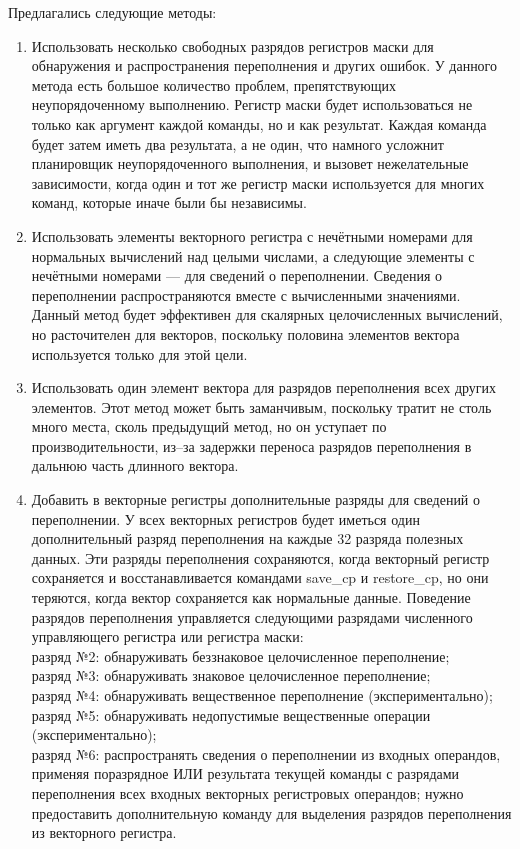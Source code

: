 \documentclass[forwardcom.tex]{subfiles}
\begin{document}
Предлагались следующие методы:
\begin{enumerate}
	\item Использовать несколько свободных разрядов регистров маски для обнаружения и распространения переполнения и других ошибок. У данного метода есть большое количество проблем, препятствующих неупорядоченному выполнению. Регистр маски будет использоваться не только как аргумент каждой команды, но и как результат. Каждая команда будет затем иметь два результата, а не один, что намного усложнит планировщик неупорядоченного выполнения, и вызовет нежелательные зависимости, когда один и тот же регистр маски используется для многих команд, которые иначе были бы независимы.
	
	\item Использовать элементы векторного регистра с нечётными номерами для нормальных вычислений над целыми числами, а следующие элементы с нечётными номерами --- для сведений о переполнении. Сведения о переполнении распространяются вместе с вычисленными значениями.	Данный метод будет эффективен для скалярных целочисленных вычислений, но расточителен для векторов, поскольку половина элементов вектора используется только для этой цели. 
	
	\item Использовать один элемент вектора для разрядов переполнения всех других элементов. Этот метод может быть заманчивым, поскольку тратит не столь много места, сколь предыдущий метод, но он уступает по производительности, из--за задержки переноса разрядов переполнения в дальнюю часть длинного вектора.
	
    \item Добавить в векторные регистры  дополнительные разряды для сведений о переполнении. У всех векторных регистров будет иметься один дополнительный разряд переполнения на каждые 32 разряда полезных данных. Эти разряды переполнения сохраняются, когда векторный регистр сохраняется и восстанавливается командами save\_cp и restore\_cp, но они теряются, когда вектор сохраняется как нормальные данные. Поведение разрядов переполнения управляется следующими разрядами численного управляющего регистра или регистра маски: \\
разряд №2: обнаруживать беззнаковое целочисленное переполнение; \\
разряд №3: обнаруживать знаковое целочисленное переполнение; \\
разряд №4: обнаруживать вещественное переполнение (экспериментально); \\
разряд №5: обнаруживать недопустимые вещественные операции (экспериментально); \\
разряд №6: распространять сведения о переполнении из входных операндов, применяя поразрядное ИЛИ результата текущей команды с разрядами переполнения  всех входных векторных регистровых операндов; нужно предоставить дополнительную команду для выделения разрядов переполнения из векторного регистра.


\end{enumerate}
\end{document}

